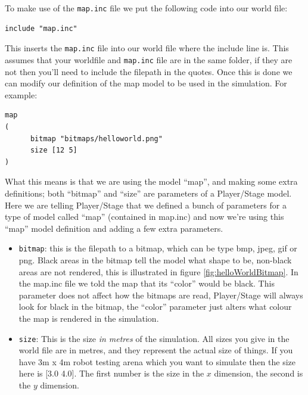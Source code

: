 \documentclass[a4paper]{report}
\newcommand{\plst}{Player/Stage\xspace}
\begin{document}
To make use of the \verb|map.inc| file we put the following code into our world file:
\begin{verbatim}
include "map.inc"
\end{verbatim}
This inserts the \verb|map.inc| file into our world file where the include line is. This assumes that your worldfile and \verb|map.inc| file are in the same folder, if they are not then you'll need to include the filepath in the quotes. Once this is done we can modify our definition of the map model to be used in the simulation. For example:
\begin{verbatim}
map
(
      bitmap "bitmaps/helloworld.png"
      size [12 5]	
)
\end{verbatim}
What this means is that we are using the model ``map'', and making some extra definitions; both ``bitmap'' and ``size'' are parameters of a \plst model. Here we are telling \plst that we defined a bunch of parameters for a type of model called ``map'' (contained in map.inc) and now we're using this ``map'' model definition and adding a few extra parameters.
\begin{itemize}
\item \verb|bitmap|: this is the filepath to a bitmap, which can be type bmp, jpeg, gif or png. Black areas in the bitmap tell the model what shape to be, non-black areas are not rendered, this is illustrated in figure \ref{fig:helloWorldBitmap}. In the map.inc file we told the map that its ``color'' would be black. This parameter does not affect how the bitmaps are read, \plst will always look for black in the bitmap, the ``color'' parameter just alters what colour the map is rendered in the simulation. 
\item \verb|size|: This is the size \emph{in metres} of the simulation. All sizes you give in the world file are in metres, and they represent the actual size of things. If you have 3m x 4m robot testing arena which you want to simulate then the size here is [3.0 4.0]. The first number is the size in the $x$ dimension, the second is the $y$ dimension.
\end{itemize}
\end{document}
